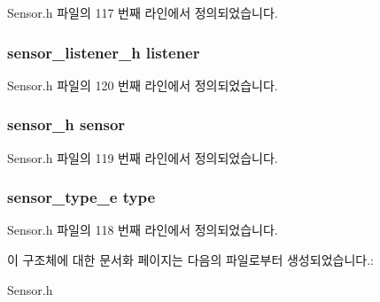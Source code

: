 Sensor.\-h 파일의 117 번째 라인에서 정의되었습니다.

\hypertarget{struct___accelerometer_extend_aa977dfb866b24fd7d9a20a9a01b2fd1f}{
\subsubsection[{listener}]{\setlength{\rightskip}{0pt plus 5cm}sensor\-\_\-listener\-\_\-h listener}}\label{struct___accelerometer_extend_aa977dfb866b24fd7d9a20a9a01b2fd1f}


Sensor.\-h 파일의 120 번째 라인에서 정의되었습니다.

\hypertarget{struct___accelerometer_extend_a5bae9b7801bc3808411925cde81d3f26}{
\subsubsection[{sensor}]{\setlength{\rightskip}{0pt plus 5cm}sensor\-\_\-h sensor}}\label{struct___accelerometer_extend_a5bae9b7801bc3808411925cde81d3f26}


Sensor.\-h 파일의 119 번째 라인에서 정의되었습니다.

\hypertarget{struct___accelerometer_extend_abffb09766da2fc510a79bb51f82a36e1}{
\subsubsection[{type}]{\setlength{\rightskip}{0pt plus 5cm}sensor\-\_\-type\-\_\-e type}}\label{struct___accelerometer_extend_abffb09766da2fc510a79bb51f82a36e1}


Sensor.\-h 파일의 118 번째 라인에서 정의되었습니다.



이 구조체에 대한 문서화 페이지는 다음의 파일로부터 생성되었습니다.\-:\begin{DoxyCompactItemize}
\item 
Sensor.\-h\end{DoxyCompactItemize}
